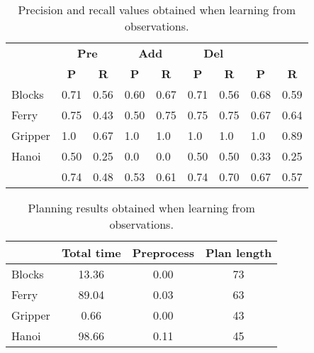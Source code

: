 \documentclass{article}
\begin{document}
\begin{table}
	\begin{footnotesize}
		\begin{center}
			\begin{tabular}{l|l|l|l|l|l|l||l|l|}
				& \multicolumn{2}{|c|}{\bf Pre} & \multicolumn{2}{|c|}{\bf Add} & \multicolumn{2}{|c||}{\bf Del} & \multicolumn{2}{|c}{\bf}\\ \cline{2-9}			
				& \multicolumn{1}{|c|}{\bf P} & \multicolumn{1}{|c|}{\bf R} & \multicolumn{1}{|c|}{\bf P} & \multicolumn{1}{|c|}{\bf R} & \multicolumn{1}{|c|}{\bf P} & \multicolumn{1}{|c||}{\bf R} &  \multicolumn{1}{|c|}{\bf P} & \multicolumn{1}{|c|}{\bf R} \\
				\hline
				Blocks & 0.71 & 0.56 & 0.60 & 0.67 & 0.71 & 0.56 & 0.68 & 0.59 \\
				Ferry & 0.75 & 0.43 & 0.50 & 0.75 & 0.75 & 0.75 & 0.67 & 0.64 \\
				Gripper & 1.0 & 0.67 & 1.0 & 1.0 & 1.0 & 1.0 & 1.0 & 0.89 \\
				Hanoi & 0.50 & 0.25 & 0.0 & 0.0 & 0.50 & 0.50 & 0.33 & 0.25 \\
				\hline
				\bf  & 0.74 & 0.48 & 0.53 & 0.61 & 0.74 & 0.70 & 0.67 & 0.57 \\
			\end{tabular}
		\end{center}
	\end{footnotesize}
  \caption{\small Precision and recall values obtained when learning from observations.}
\label{fig:observations}       
\end{table}

\begin{table}
	\begin{footnotesize}
		\begin{center}
			\begin{tabular}{l|c|c|c|}			
				& Total time & Preprocess & Plan length  \\
				\hline
				Blocks & 13.36 & 0.00 & 73  \\
				Ferry & 89.04 & 0.03 & 63 \\
				Gripper & 0.66 & 0.00 & 43 \\
				Hanoi & 98.66 & 0.11 & 45  \\
			\end{tabular}
		\end{center}
	\end{footnotesize}
 \caption{\small Planning results obtained when learning from observations.}
\label{fig:planobservations}	
\end{table}
\end{document}
